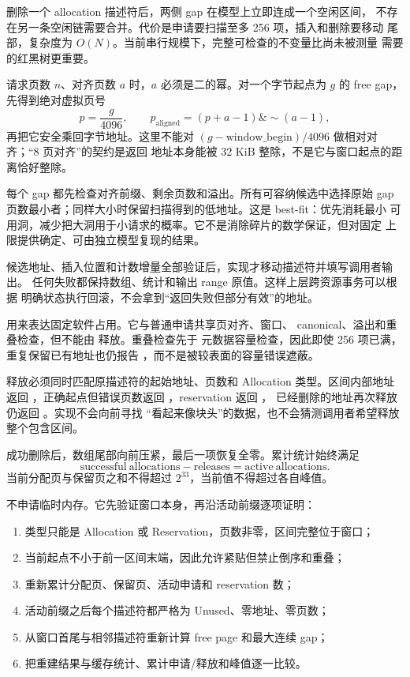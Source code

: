删除一个 allocation 描述符后，两侧 gap 在模型上立即连成一个空闲区间，
不存在另一条空闲链需要合并。代价是申请要扫描至多 256 项，插入和删除要移动
尾部，复杂度为 \(O(N)\)。当前串行规模下，完整可检查的不变量比尚未被测量
需要的红黑树更重要。

请求页数 \(n\)、对齐页数 \(a\) 时，\(a\) 必须是二的幂。对一个字节起点为
\(g\) 的 free gap，先得到绝对虚拟页号
\[
 p=\frac{g}{4096},
 \qquad
 p_{\mathrm{aligned}}=(p+a-1)\mathbin{\&}\sim(a-1),
\]
再把它安全乘回字节地址。这里不能对
\((g-\mathrm{window\_begin})/4096\) 做相对对齐；“8 页对齐”的契约是返回
地址本身能被 32 KiB 整除，不是它与窗口起点的距离恰好整除。

每个 gap 都先检查对齐前缀、剩余页数和溢出。所有可容纳候选中选择原始 gap
页数最小者；同样大小时保留扫描得到的低地址。这是 best-fit：优先消耗最小
可用洞，减少把大洞用于小请求的概率。它不是消除碎片的数学保证，但对固定
上限提供确定、可由独立模型复现的结果。

候选地址、插入位置和计数增量全部验证后，实现才移动描述符并填写调用者输出。
任何失败都保持数组、统计和输出 range 原值。这样上层跨资源事务可以根据
明确状态执行回滚，不会拿到“返回失败但部分有效”的地址。

 用来表达固定软件占用。它与普通申请共享页对齐、窗口、
canonical、溢出和重叠检查，但不能由  释放。重叠检查先于
元数据容量检查，因此即使 256 项已满，重复保留已有地址也仍报告
，而不是被较表面的容量错误遮蔽。

释放必须同时匹配原描述符的起始地址、页数和 Allocation 类型。区间内部地址
返回 ，正确起点但错误页数返回
，reservation 返回 ，
已经删除的地址再次释放仍返回 。实现不会向前寻找
“看起来像块头”的数据，也不会猜测调用者希望释放整个包含区间。

成功删除后，数组尾部向前压紧，最后一项恢复全零。累计统计始终满足
\[
 \mathrm{successful\ allocations}
 -
 \mathrm{releases}
 =
 \mathrm{active\ allocations}.
\]
当前分配页与保留页之和不得超过 \(2^{33}\)，当前值不得超过各自峰值。

 不申请临时内存。它先验证窗口本身，再沿活动前缀逐项证明：

\begin{enumerate}[label=\arabic*.]
  \item 类型只能是 Allocation 或 Reservation，页数非零，区间完整位于窗口；
  \item 当前起点不小于前一区间末端，因此允许紧贴但禁止倒序和重叠；
  \item 重新累计分配页、保留页、活动申请和 reservation 数；
  \item 活动前缀之后每个描述符都严格为 Unused、零地址、零页数；
  \item 从窗口首尾与相邻描述符重新计算 free page 和最大连续 gap；
  \item 把重建结果与缓存统计、累计申请/释放和峰值逐一比较。
\end{enumerate}

